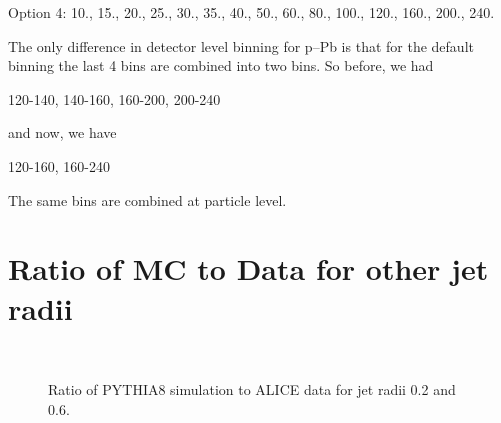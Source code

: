 \documentclass[ALICE]{ALICE_analysis_notes}
\newcommand{\pPb}{{\mbox{p--Pb}}\xspace}
\begin{document}
\begin{appendix}
\bigskip

Option 4:
10., 15., 20., 25., 30., 35., 40., 50., 60., 80., 100., 120., 160., 200., 240.

The only difference in detector level binning for \pPb is that for the default binning the last 4 bins are combined into two bins. So before, we had

120-140, 140-160, 160-200, 200-240

and now, we have

120-160, 160-240

The same bins are combined at particle level.

\newpage

\section{Ratio of MC to Data for other jet radii}
\label{sec:appendixRatioSimData}

\begin{figure}[h!]
    \centering
    \qquad
    \\
    \caption{Ratio of PYTHIA8 simulation to ALICE data for jet radii 0.2 and 0.6.}
    \label{fig:appendixMCGen_RatioDataMC}
\end{figure}


\end{appendix}
\end{document}
